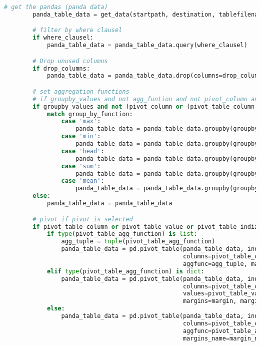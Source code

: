 \begin{lstlisting}[language=python, caption=Python LaTex - pandas\_dataframe\_to\_latex\_table.py CSV - LaTex Tabelle,captionpos=b,label={lst:Python LaTex - pandas_dataframe_to_latex_table},breaklines=true]
        # get the pandas (panda data)
        panda_table_data = get_data(startpath, destination, tablefilename, datafile_path, datafile, alternative_cvs_load, separator, decimal)

        # filter by where clausel
        if where_clausel:
            panda_table_data = panda_table_data.query(where_clausel)

        # Drop unused columns
        if drop_columns:
            panda_table_data = panda_table_data.drop(columns=drop_columns)

        # set aggregation functions
        # if groupby_values and not agg_funtion and not pivot_column and not pivot_table_column:
        if groupby_values and not (pivot_column or (pivot_table_column or pivot_table_value or pivot_table_indizes)):
            match group_by_function:
                case 'max':
                    panda_table_data = panda_table_data.groupby(groupby_values, as_index=False).max()
                case 'min':
                    panda_table_data = panda_table_data.groupby(groupby_values, as_index=False).min()
                case 'head':
                    panda_table_data = panda_table_data.groupby(groupby_values, as_index=False).head()
                case 'sum':
                    panda_table_data = panda_table_data.groupby(groupby_values, as_index=False).sum()
                case 'mean':
                    panda_table_data = panda_table_data.groupby(groupby_values, as_index=False).mean()
        else:
            panda_table_data = panda_table_data

        # pivot if pivot is selected
        if pivot_table_column or pivot_table_value or pivot_table_indizes:
            if type(pivot_table_agg_function) is list:
                agg_tuple = tuple(pivot_table_agg_function)
                panda_table_data = pd.pivot_table(panda_table_data, index=pivot_table_indizes,
                                                  columns=pivot_table_column, values=pivot_table_value,
                                                  aggfunc=agg_tuple, margins=margin, margins_name=margin_name)
            elif type(pivot_table_agg_function) is dict:
                panda_table_data = pd.pivot_table(panda_table_data, index=pivot_table_indizes,
                                                  columns=pivot_table_column,
                                                  values=pivot_table_value, aggfunc=pivot_table_agg_function,
                                                  margins=margin, margins_name=margin_name)
            else:
                panda_table_data = pd.pivot_table(panda_table_data, index=pivot_table_indizes,
                                                  columns=pivot_table_column, values=pivot_table_value,
                                                  aggfunc=pivot_table_agg_function, margins=margin,
                                                  margins_name=margin_name)


\end{lstlisting}
